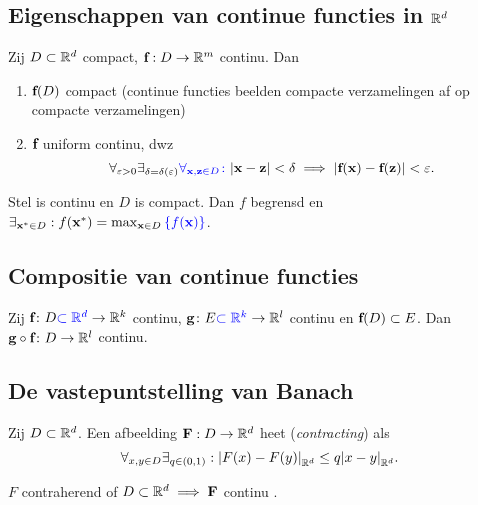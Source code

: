 \documentclass{2wa40summary}
\begin{document}
\subsection{Eigenschappen van continue functies in $\mathbb{R}^d$}
\begin{theorem}
Zij $D \subset \mathbb{R}^d$ compact, ${\textbf{f}}:D\rightarrow\mathbb{R}^m$ continu. Dan 
\begin{enumerate}[(1)]
\item ${\textbf{f}}(D)$ compact (continue functies beelden compacte verzamelingen af op compacte verzamelingen)
\item ${\textbf{f}}$ uniform continu, dwz
\[\forall_{\varepsilon > 0} \exists_{\delta = \delta(\varepsilon)}{\color{blue}\forall_{{\textbf{x}},{\textbf{z}}\in D}\colon}
{\left|{\textbf{x}}-{\textbf{z}}\right|}<\delta \implies |{\textbf{f}}({\textbf{x}})-{\textbf{f}}({\textbf{z}})|<\varepsilon.
\]
\end{enumerate}
\end{theorem}
Stel  is continu
en $D$ is compact. Dan  $f$ begrensd en $\exists_{{\textbf{x}}^* \in D}:f({\textbf{x}}^*)=\max_{{\textbf{x}}\in D}{\color{blue}\lbrace f({\textbf{x}})\rbrace}$.

\subsection{Compositie van continue functies}
			\theorem Zij ${\textbf{f}}\colon D{\color{blue}\subset\mathbb{R}^d}\rightarrow \mathbb{R}^k$ continu, ${\textbf{g}}\colon E{\color{blue}\subset\mathbb{R}^k}\rightarrow \mathbb{R}^l$ continu en ${\textbf{f}}(D) \subset E$. Dan ${\textbf{g}} \circ {\textbf{f}}\colon D\rightarrow \mathbb{R}^l$ continu.
		
		\subsection{De vastepuntstelling van Banach}
\begin{theorem}
Zij $D \subset \mathbb{R}^d$.
Een afbeelding ${\textbf{F}}:D \rightarrow \mathbb{R}^d$ heet  (\textit{contracting}) als
\[\forall _{x,y\in D}\exists _{q \in (0,1)}:{\left|F(x)-F(y)\right|}_{\mathbb{R}^d} \leq q{\left|x-y\right|}_{\mathbb{R}^d}. \]
\end{theorem}


\gevolg $F$ contraherend of $D\subset\mathbb{R}^d\implies{\textbf{F}}$ continu .

			
\end{document}
